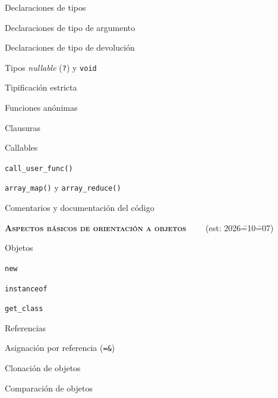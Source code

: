 \begin{longenum}
\begin{longenum}
\begin{longenum}
            \item Declaraciones de tipos
            \begin{longenum}
                \item Declaraciones de tipo de argumento
                \item Declaraciones de tipo de devolución
                \item Tipos \textit{nullable} (\texttt{?}) y \texttt{void}
                \item Tipificación estricta
            \end{longenum}
            \item Funciones anónimas
            \begin{longenum}
                \item Clausuras
            \end{longenum}
            \item Callables
            \begin{longenum}
                \item \texttt{call\_user\_func()}
                \item \texttt{array\_map()} y \texttt{array\_reduce()}
            \end{longenum}
        \end{longenum}
        \item Comentarios y documentación del código
    \end{longenum}
    \item \textbf{\textsc{Aspectos básicos de orientación a objetos}} \ \ \ \ (est: 2026\==10\==07)
    \begin{longenum}
        \item Objetos
        \begin{longenum}
            \item \texttt{new}
            \item \texttt{instanceof}
            \item \texttt{get\_class}
        \end{longenum}
        \item Referencias
        \begin{longenum}
            \item Asignación por referencia (\texttt{=\&})
        \end{longenum}
        \item Clonación de objetos
        \item Comparación de objetos

\end{longenum}
\end{longenum}

